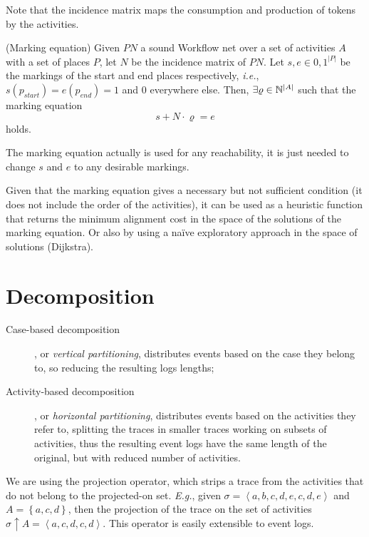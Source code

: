 \documentclass[a4paper]{report}
\begin{document}
Note that the incidence matrix maps the consumption and production of tokens by the activities.

\begin{definition}
    (Marking equation) Given $PN$ a sound Workflow net over a set of activities $A$ with a set of places $P$, let $N$ be the incidence matrix of $PN$. Let $s,e\in {0,1}^{|P|}$ be the markings of the start and end places respectively, \emph{i.e.}, $s(p_{start})=e(p_{end})=1$ and $0$ everywhere else. Then, $\exists \varrho\in \mathbb{N}^{|A|}$ such that the marking equation \[
	s + N\cdot \varrho = e
    \] holds.
\end{definition}

\begin{note}
    The marking equation actually is used for any reachability, it is just needed to change $s$ and $e$ to any desirable markings.
\end{note}

Given that the marking equation gives a necessary but not sufficient condition (it does not include the order of the activities), it can be used as a heuristic function that returns the minimum alignment cost in the space of the solutions of the marking equation. Or also by using a naïve exploratory approach in the space of solutions (Dijkstra).

\section*{Decomposition}

\begin{description}
    \item[Case-based decomposition], or \emph{vertical partitioning}, distributes events based on the case they belong to, so reducing the resulting logs lengths;
    \item[Activity-based decomposition], or \emph{horizontal partitioning}, distributes events based on the activities they refer to, splitting the traces in smaller traces working on subsets of activities, thus the resulting event logs have the same length of the original, but with reduced number of activities.
\end{description}

\begin{note}
    We are using the projection operator, which strips a trace from the activities that do not belong to the projected-on set. \emph{E.g.}, given $\sigma=\left<a,b,c,d,e,c,d,e \right>$ and $A=\left\{ a,c,d \right\} $, then the projection of the trace on the set of activities $\sigma\uparrow A = \left< a,c,d,c,d\right>$. This operator is easily extensible to event logs.
\end{note}
\end{document}

